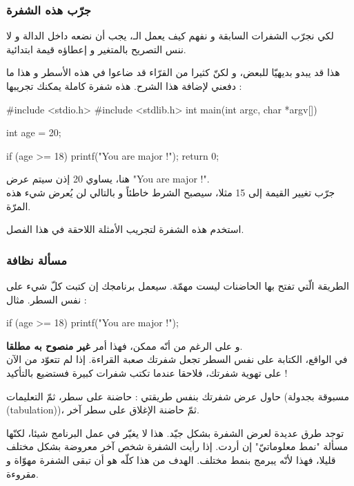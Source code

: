 \subsubsection{جرّب هذه الشفرة}
لكي نجرّب الشفرات السابقة و نفهم كيف يعمل الـ، يجب أن نضعه داخل الدالة
و لا ننس التصريح بالمتغير 
و إعطاؤه قيمة ابتدائية.

هذا قد يبدو بديهيّا للبعض، و لكنّ كثيرا من القرّاء قد ضاعوا في هذه الأسطر و هذا ما دفعني لإضافة هذا الشرح. هذه شفرة كاملة يمكنك تجريبها :

\begin{Csource}
#include <stdio.h>
#include <stdlib.h>
int main(int argc, char *argv[])
{
	int age = 20;
	
	if (age >= 18)
	{
		printf("You are major !\n");
	}
	return 0;
}
\end{Csource}

هنا،
يساوي 20 إذن سيتم عرض
"\textenglish{You are major !}".\\
جرّب تغيير القيمة إلى 15 مثلا، سيصبح الشرط خاطئاً و بالتالي لن يُعرض شيء هذه المرّة.

استخدم هذه الشفرة لتجريب الأمثلة اللاحقة في هذا الفصل.

\subsubsection{مسألة نظافة}

الطريقة الّتي تفتح بها الحاضنات ليست مهمّة. سيعمل برنامجك إن كتبت كلّ شيء على نفس السطر. مثال :

\begin{Csource}
if (age >= 18) { printf("You are major !"); }
\end{Csource}

و على الرغم من أنّه ممكن، فهذا أمر
\textbf{غير منصوح به مطلقا}.\\
في الواقع، الكتابة على نفس السطر تجعل شفرتك صعبة القراءة. إذا لم تتعوّد من الآن على تهوية شفرتك، فلاحقا عندما تكتب شفرات كبيرة فستضيع بالتأكيد !

حاول عرض شفرتك بنفس طريقتي : حاضنة على سطر، ثمّ التعليمات (مسبوقة بجدولة 
(\textenglish{tabulation}))،
 ثمّ حاضنة الإغلاق على سطر آخر.

\begin{information}
توجد طرق عديدة لعرض الشفرة بشكل جيّد. هذا لا يغيّر في عمل البرنامج شيئا، لكنّها مسألة "نمط معلوماتيّ" إن أردت. إذا رأيت الشفرة شخص آخر معروضة بشكل مختلف قليلا، فهذا لأنّه يبرمج بنمط مختلف. الهدف من هذا كلّه هو أن تبقى الشفرة مهوّاة و مقروءة.
\end{information}

